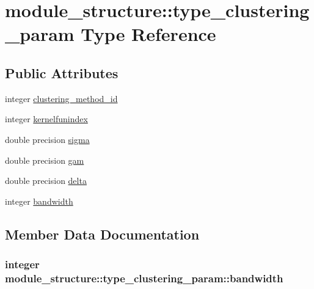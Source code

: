 \hypertarget{structmodule__structure_1_1type__clustering__param}{}\section{module\+\_\+structure\+:\+:type\+\_\+clustering\+\_\+param Type Reference}
\label{structmodule__structure_1_1type__clustering__param}
\subsection*{Public Attributes}
\begin{DoxyCompactItemize}
\item 
integer \hyperlink{structmodule__structure_1_1type__clustering__param_a8bf29172007ac2bb0927ec135406618e}{clustering\+\_\+method\+\_\+id}
\item 
integer \hyperlink{structmodule__structure_1_1type__clustering__param_a1005f14a680a96a6b66bd82783d2153d}{kernelfunindex}
\item 
double precision \hyperlink{structmodule__structure_1_1type__clustering__param_a59a4870d2f3810136942a6f1ec116d0d}{sigma}
\item 
double precision \hyperlink{structmodule__structure_1_1type__clustering__param_ab899422852cb7f39a9dfeef2c3bed12f}{gam}
\item 
double precision \hyperlink{structmodule__structure_1_1type__clustering__param_a63047cf3dfca24f6c1647a1ee2b49f16}{delta}
\item 
integer \hyperlink{structmodule__structure_1_1type__clustering__param_ae401e511466a239a46f1a1233ba5b998}{bandwidth}
\end{DoxyCompactItemize}


\subsection{Member Data Documentation}
\hypertarget{structmodule__structure_1_1type__clustering__param_ae401e511466a239a46f1a1233ba5b998}{}
\subsubsection[{bandwidth}]{\setlength{\rightskip}{0pt plus 5cm}integer module\+\_\+structure\+::type\+\_\+clustering\+\_\+param\+::bandwidth}\label{structmodule__structure_1_1type__clustering__param_ae401e511466a239a46f1a1233ba5b998}
\hypertarget{structmodule__structure_1_1type__clustering__param_a8bf29172007ac2bb0927ec135406618e}{}
